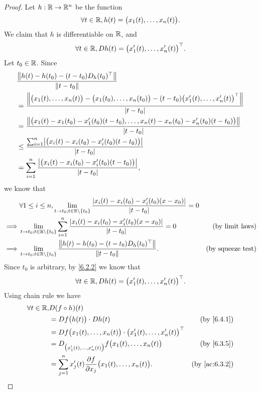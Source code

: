 \begin{proof}
  Let \(h : \R \to \R^n\) be the function
  \[
    \forall t \in \R, h(t) = \big(x_1(t), \dots, x_n(t)\big).
  \]
  We claim that \(h\) is differentiable on \(\R\), and
  \[
    \forall t \in \R, D h(t) = \big(x_1'(t), \dots, x_n'(t)\big)^\top.
  \]
  Let \(t_0 \in \R\).
  Since
  \begin{align*}
     & \frac{\norm*{h(t) - h(t_0) - (t - t_0) D_h(t_0)^\top}}{\norm*{t - t_0}}                                                                                  \\
     & = \frac{\norm*{\big(x_1(t), \dots, x_n(t)\big) - \big(x_1(t_0), \dots, x_n(t_0)\big) - (t - t_0) \big(x_1'(t), \dots, x_n'(t)\big)^\top}}{\abs{t - t_0}} \\
     & = \frac{\norm*{\big(x_1(t) - x_1(t_0) - x_1'(t_0)(t - t_0), \dots, x_n(t) - x_n(t_0) - x_n'(t_0)(t - t_0)\big)}}{\abs{t - t_0}}                          \\
     & \leq \frac{\sum_{i = 1}^n \abs{\big(x_i(t) - x_i(t_0) - x_i'(t_0)(t - t_0)\big)}}{\abs{t - t_0}}                                                         \\
     & = \sum_{i = 1}^n \frac{\abs{\big(x_i(t) - x_i(t_0) - x_i'(t_0)(t - t_0)\big)}}{\abs{t - t_0}},
  \end{align*}
  we know that
  \begin{align*}
             & \forall 1 \leq i \leq n, \lim_{t \to t_0 ; t \in \R \setminus \{t_0\}} \frac{\abs{x_i(t) - x_i(t_0) - x_i'(t_0)(x - x_0)}}{\abs{t - t_0}} = 0                            \\
    \implies & \lim_{t \to t_0 ; t \in \R \setminus \{t_0\}} \sum_{i = 1}^n \frac{\abs{x_i(t) - x_i(t_0) - x_i'(t_0)(x - x_0)}}{\abs{t - t_0}} = 0           & \text{(by limit laws)}   \\
    \implies & \lim_{t \to t_0 ; t \in \R \setminus \{t_0\}} \frac{\norm*{h(t) - h(t_0) - (t - t_0) D_h(t_0)^\top}}{\norm*{t - t_0}}.                        & \text{(by squeeze test)}
  \end{align*}
  Since \(t_0\) is arbitrary, by \cref{6.2.2} we know that
  \[
    \forall t \in \R, D h(t) = \big(x_1'(t), \dots, x_n'(t)\big)^\top.
  \]
  Using chain rule we have
  \begin{align*}
    \forall t \in \R, & D (f \circ h)(t)                                                                                                       \\
                      & = D f\big(h(t)\big) \cdot D h(t)                                                         & \text{(by \cref{6.4.1})}    \\
                      & = D f\big(x_1(t), \dots, x_n(t)\big) \cdot \big(x_1'(t), \dots, x_n'(t)\big)^\top                                      \\
                      & = D_{\big(x_1'(t), \dots, x_n'(t)\big)} f\big(x_1(t), \dots, x_n(t)\big)                 & \text{(by \cref{6.3.5})}    \\
                      & = \sum_{j = 1}^n x_j'(t) \frac{\partial f}{\partial x_j}\big(x_1(t), \dots, x_n(t)\big). & \text{(by \cref{ac:6.3.2})}
  \end{align*}
\end{proof}

